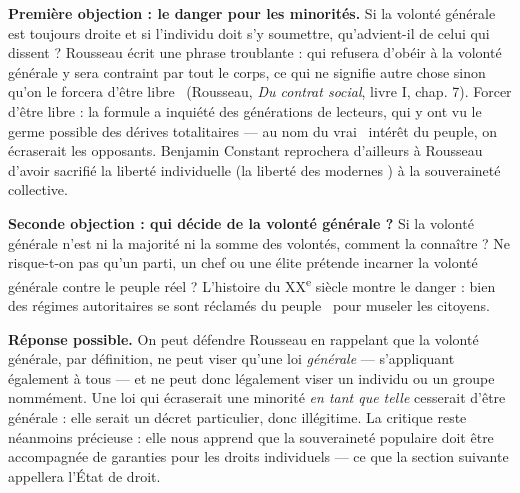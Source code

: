 \documentclass[11pt]{article}
\begin{document}
\textbf{Première objection : le danger pour les minorités.} Si la volonté générale est toujours droite et si l'individu doit s'y soumettre, qu'advient-il de celui qui dissent ? Rousseau écrit une phrase troublante : qui refusera d'obéir à la volonté générale y sera contraint par tout le corps, \guillemotleft ce qui ne signifie autre chose sinon qu'on le forcera d'être libre \guillemotright\ (Rousseau, \emph{Du contrat social}, livre I, chap. 7). Forcer d'être libre : la formule a inquiété des générations de lecteurs, qui y ont vu le germe possible des dérives totalitaires — au nom du \guillemotleft vrai \guillemotright\ intérêt du peuple, on écraserait les opposants. Benjamin Constant reprochera d'ailleurs à Rousseau d'avoir sacrifié la liberté individuelle (la \guillemotleft liberté des modernes \guillemotright) à la souveraineté collective.

\textbf{Seconde objection : qui décide de la volonté générale ?} Si la volonté générale n'est ni la majorité ni la somme des volontés, comment la connaître ? Ne risque-t-on pas qu'un parti, un chef ou une élite prétende incarner la volonté générale contre le peuple réel ? L'histoire du XX\textsuperscript{e} siècle montre le danger : bien des régimes autoritaires se sont réclamés du \guillemotleft peuple \guillemotright\ pour museler les citoyens.

\textbf{Réponse possible.} On peut défendre Rousseau en rappelant que la volonté générale, par définition, ne peut viser qu'une loi \emph{générale} — s'appliquant également à tous — et ne peut donc légalement viser un individu ou un groupe nommément. Une loi qui écraserait une minorité \emph{en tant que telle} cesserait d'être générale : elle serait un décret particulier, donc illégitime. La critique reste néanmoins précieuse : elle nous apprend que la souveraineté populaire doit être accompagnée de garanties pour les droits individuels — ce que la section suivante appellera l'État de droit.
\end{document}
